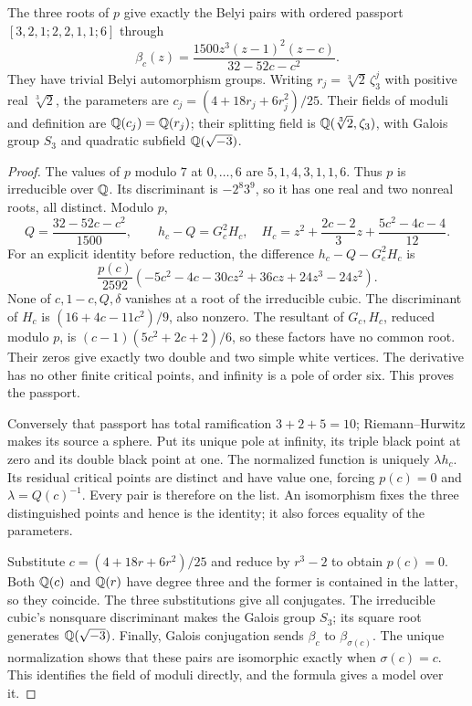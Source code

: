 \begin{proposition}\label{prop:sextic-complete}
The three roots of $p$ give exactly the Belyi pairs with ordered
passport $[3,2,1;2,2,1,1;6]$ through
\[
 \beta_c(z)=\frac{1500z^3(z-1)^2(z-c)}{32-52c-c^2}.
\]
They have trivial Belyi automorphism groups. Writing
$r_j=\sqrt[3]{2}\,\zeta_3^j$ with positive real $\sqrt[3]{2}$,
the parameters are
$c_j=(4+18r_j+6r_j^2)/25$. Their fields of moduli and definition are
$\mathbb Q(c_j)=\mathbb Q(r_j)$; their splitting field is
$\mathbb Q(\sqrt[3]{2},\zeta_3)$, with Galois group $S_3$ and quadratic
subfield $\mathbb Q(\sqrt{-3})$.
\end{proposition}
\begin{proof}
The values of $p$ modulo $7$ at $0,\ldots,6$ are
$5,1,4,3,1,1,6$. Thus $p$ is irreducible over $\mathbb Q$.
Its discriminant is $-2^8 3^9$, so it has one real and two nonreal
roots, all distinct. Modulo $p$,
\[
 Q=\frac{32-52c-c^2}{1500},\qquad
 h_c-Q=G_c^2H_c,
 \quad H_c=z^2+\frac{2c-2}{3}z+\frac{5c^2-4c-4}{12}.
\]
For an explicit identity before reduction, the difference
$h_c-Q-G_c^2H_c$ is
\[
 \frac{p(c)}{2592}
 (-5c^2-4c-30cz^2+36cz+24z^3-24z^2).
\]
None of $c,1-c,Q,\delta$ vanishes at a root of the irreducible cubic.
The discriminant of $H_c$ is $(16+4c-11c^2)/9$, also nonzero.
The resultant of $G_c,H_c$, reduced modulo $p$, is
$(c-1)(5c^2+2c+2)/6$, so these factors have no common root.
Their zeros give exactly two double and two simple white vertices.
The derivative has no other finite critical points, and infinity is
a pole of order six. This proves the passport.

Conversely that passport has total ramification $3+2+5=10$;
Riemann--Hurwitz makes its source a sphere. Put its unique pole at
infinity, its triple black point at zero and its double black point
at one. The normalized function is uniquely $\lambda h_c$.
Its residual critical points are distinct and have value one, forcing
$p(c)=0$ and $\lambda=Q(c)^{-1}$. Every pair is therefore on the list.
An isomorphism fixes the three distinguished points and hence is the
identity; it also forces equality of the parameters.

Substitute $c=(4+18r+6r^2)/25$ and reduce by $r^3-2$ to obtain
$p(c)=0$. Both $\mathbb Q(c)$ and $\mathbb Q(r)$ have degree three and the former
is contained in the latter, so they coincide. The three substitutions
give all conjugates. The irreducible cubic's nonsquare discriminant
makes the Galois group $S_3$; its square root generates
$\mathbb Q(\sqrt{-3})$. Finally, Galois conjugation sends $\beta_c$ to
$\beta_{\sigma(c)}$. The unique normalization shows that these pairs
are isomorphic exactly when $\sigma(c)=c$. This identifies the field
of moduli directly, and the formula gives a model over it.
\end{proof}

